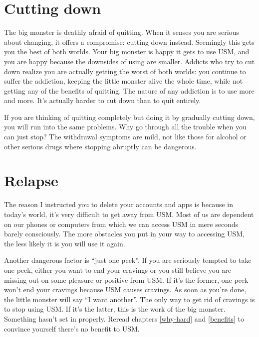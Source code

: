 \documentclass[
]{book}
\begin{document}
\section{Cutting down}\label{cutting-down}

The big monster is deathly afraid of quitting. When it senses you are serious about changing, it offers a compromise: cutting down instead. Seemingly this gets you the best of both worlds. Your big monster is happy it gets to use USM, and you are happy because the downsides of using are smaller. Addicts who try to cut down realize you are actually getting the worst of both worlds: you continue to suffer the addiction, keeping the little monster alive the whole time, while not getting any of the benefits of quitting. The nature of any addiction is to use more and more. It's actually harder to cut down than to quit entirely.

If you are thinking of quitting completely but doing it by gradually cutting down, you will run into the same problems. Why go through all the trouble when you can just stop? The withdrawal symptoms are mild, not like those for alcohol or other serious drugs where stopping abruptly can be dangerous.

\section{Relapse}\label{relapse}

The reason I instructed you to delete your accounts and apps is because in today's world, it's very difficult to get away from USM. Most of us are dependent on our phones or computers from which we can access USM in mere seconds barely consciously. The more obstacles you put in your way to accessing USM, the less likely it is you will use it again.

Another dangerous factor is ``just one peek''. If you are seriously tempted to take one peek, either you want to end your cravings or you still believe you are missing out on some pleasure or positive from USM. If it's the former, one peek won't end your cravings because USM causes cravings. As soon as you're done, the little monster will say ``I want another''. The only way to get rid of cravings is to stop using USM. If it's the latter, this is the work of the big monster. Something hasn't set in properly. Reread chapters \ref{why-hard} and \ref{benefits} to convince yourself there's no benefit to USM.
\end{document}
